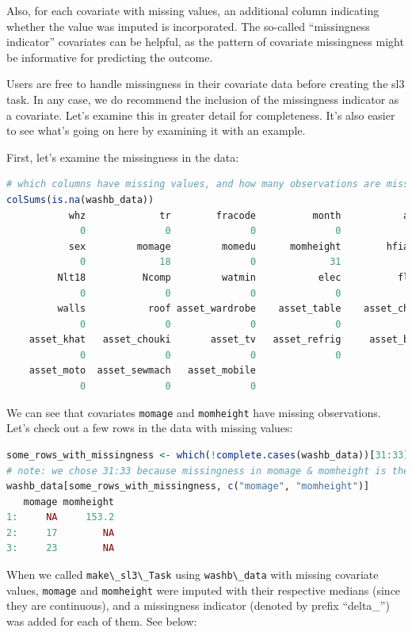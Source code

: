 \documentclass[
  12pt, krantz2,
]{krantz}
\newcommand{\passthrough}[1]{#1}
\newcommand{\1}{\mathbbm{1}}
\theoremstyle{definition}
\theoremstyle{definition}
\theoremstyle{definition}
\theoremstyle{definition}
\theoremstyle{remark}
\begin{document}
Also, for each covariate with missing values, an additional column indicating
whether the value was imputed is incorporated. The so-called ``missingness
indicator'' covariates can be helpful, as the pattern of covariate missingness
might be informative for predicting the outcome.

Users are free to handle missingness in their covariate data before creating
the sl3 task. In any case, we do recommend the inclusion of the
missingness indicator as a covariate. Let's examine this in greater detail for
completeness. It's also easier to see what's going on here by examining it with
an example.

First, let's examine the missingness in the data:

\begin{lstlisting}[language=R]
# which columns have missing values, and how many observations are missing?
colSums(is.na(washb_data))
           whz             tr        fracode          month           aged 
             0              0              0              0              0 
           sex         momage         momedu      momheight        hfiacat 
             0             18              0             31              0 
         Nlt18          Ncomp         watmin           elec          floor 
             0              0              0              0              0 
         walls           roof asset_wardrobe    asset_table    asset_chair 
             0              0              0              0              0 
    asset_khat   asset_chouki       asset_tv   asset_refrig     asset_bike 
             0              0              0              0              0 
    asset_moto  asset_sewmach   asset_mobile 
             0              0              0 
\end{lstlisting}

We can see that covariates \passthrough{\lstinline!momage!} and \passthrough{\lstinline!momheight!} have missing observations.
Let's check out a few rows in the data with missing values:

\begin{lstlisting}[language=R]
some_rows_with_missingness <- which(!complete.cases(washb_data))[31:33]
# note: we chose 31:33 because missingness in momage & momheight is there
washb_data[some_rows_with_missingness, c("momage", "momheight")]
   momage momheight
1:     NA     153.2
2:     17        NA
3:     23        NA
\end{lstlisting}

When we called \passthrough{\lstinline!make\_sl3\_Task!} using \passthrough{\lstinline!washb\_data!} with missing covariate values,
\passthrough{\lstinline!momage!} and \passthrough{\lstinline!momheight!} were imputed with their respective medians (since they
are continuous), and a missingness indicator (denoted by prefix ``delta\_'') was
added for each of them. See below:
\end{document}

